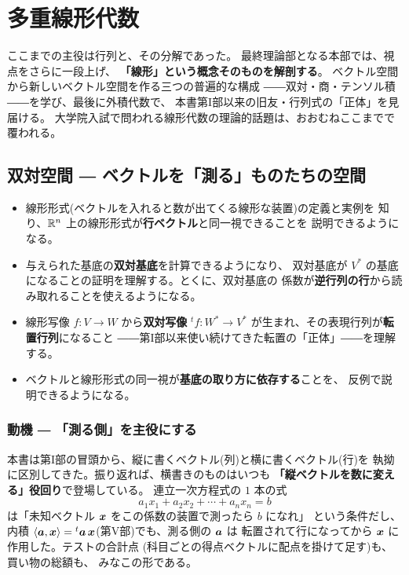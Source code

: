 \part{多重線形代数}

ここまでの主役は行列と、その分解であった。
最終理論部となる本部では、視点をさらに一段上げ、
\textbf{「線形」という概念そのものを解剖する}。
ベクトル空間から新しいベクトル空間を作る三つの普遍的な構成
――双対・商・テンソル積――を学び、最後に外積代数で、
本書第I部以来の旧友・行列式の「正体」を見届ける。
大学院入試で問われる線形代数の理論的話題は、おおむねここまでで覆われる。

\chapter{双対空間 ― ベクトルを「測る」ものたちの空間}\label{chap:dual}

\begin{goal}
\begin{itemize}
\item 線形形式(ベクトルを入れると数が出てくる線形な装置)の定義と実例を
知り、$\mathbb{R}^n$ 上の線形形式が\textbf{行ベクトル}と同一視できることを
説明できるようになる。
\item 与えられた基底の\textbf{双対基底}を計算できるようになり、
双対基底が $V^{*}$ の基底になることの証明を理解する。とくに、双対基底の
係数が\textbf{逆行列の行}から読み取れることを使えるようになる。
\item 線形写像 $f : V \to W$ から\textbf{双対写像} ${}^tf : W^{*} \to V^{*}$
が生まれ、その表現行列が\textbf{転置行列}になること
――第I部以来使い続けてきた転置の「正体」――を理解する。
\item ベクトルと線形形式の同一視が\textbf{基底の取り方に依存する}ことを、
反例で説明できるようになる。
\end{itemize}
\end{goal}

\section{動機 ― 「測る側」を主役にする}

本書は第I部の冒頭から、縦に書くベクトル(列)と横に書くベクトル(行)を
執拗に区別してきた。振り返れば、横書きのものはいつも
\textbf{「縦ベクトルを数に変える」役回り}で登場している。
連立一次方程式の $1$ 本の式
\[
a_1 x_1 + a_2 x_2 + \cdots + a_n x_n = b
\]
は「未知ベクトル $\bm{x}$ をこの係数の装置で測ったら $b$ になれ」
という条件だし、内積 $\langle \bm{a}, \bm{x} \rangle
= {}^t\bm{a}\,\bm{x}$(第V部)でも、測る側の $\bm{a}$ は
転置されて行になってから $\bm{x}$ に作用した。テストの合計点
(科目ごとの得点ベクトルに配点を掛けて足す)も、買い物の総額も、
みなこの形である。

